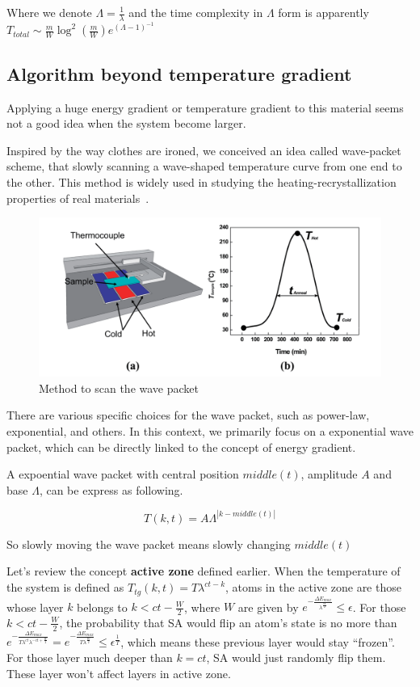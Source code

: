 \documentclass[twocolumn,superscriptaddress,english,showpacs,longbibliography]{revtex4-2}
\begin{document}
Where we denote $\Lambda = \frac{1}{\lambda}$ and the time complexity in $\Lambda$ form is apparently
$T_{total} \sim \frac{m}{W}\log^2(\frac{m}{W})e^{(\Lambda-1)^{-1}}$



\subsection{Algorithm beyond temperature
gradient}\label{algorithm-beyond-temperature-gradient}

Applying a huge energy gradient or temperature gradient to this material
seems not a good idea when the system become larger.

Inspired by the way clothes are ironed, we conceived an idea called wave-packet scheme, that slowly
scanning a wave-shaped temperature curve from one end to the other. This
method is widely used in studying the heating-recrystallization
properties of real materials~\cite{Zhang2014}.

\begin{figure}[h]
\centering
\includegraphics[width=\columnwidth]{../notes/images/zhang2014.png}
\caption{Method to scan the wave packet}
\end{figure}

There are various specific choices for the wave packet, such as
power-law, exponential, and others. In this context, we primarily focus
on a exponential wave packet, which can be directly linked to the
concept of energy gradient.

A expoential wave packet with central position $middle(t)$, amplitude
$A$ and base $\Lambda$, can be express as following.

\[
T(k,t) = A\Lambda^{|k-middle(t)|}
\]

So slowly moving the wave packet means slowly changing $middle(t)$

Let's review the concept \textbf{active zone} defined earlier. When the
temperature of the system is defined as
$T_{tg}(k, t) = T\lambda^{ct-k}$, atoms in the active zone are those
whose layer $k$ belongs to $k<ct - \frac{W}{2}$, where $W$ are
given by
$e^{-\frac{\Delta E_{max}}{\lambda^{\frac{W}{2}}}}\leq \epsilon$. For
those $k<ct - \frac{W}{2}$, the probability that SA would flip an
atom's state is no more than
$e^{-\frac{\Delta E_{max}}{T\lambda^{ct}\lambda^{-ct + \frac{W}{2}}}}=e^{-\frac{\Delta E_{max}}{T\lambda^{\frac{W}{2}}}}\leq \epsilon^{\frac{1}{T}}$,
which means these previous layer would stay ``frozen''. For those layer
much deeper than $k = ct$, SA would just randomly flip them. These
layer won't affect layers in active zone.
\end{document}
